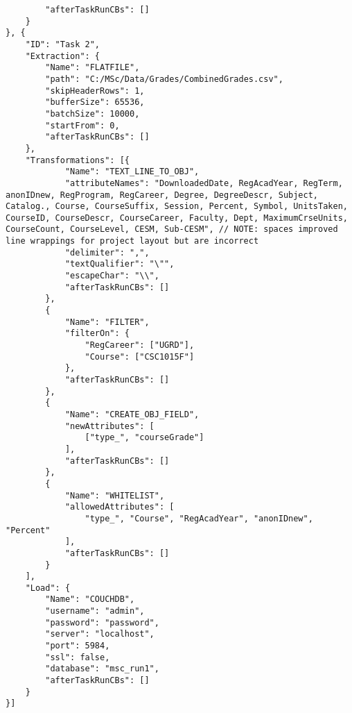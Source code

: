 \begin{verbatim}
        "afterTaskRunCBs": []
    }
}, {
    "ID": "Task 2",
    "Extraction": {
        "Name": "FLATFILE",
        "path": "C:/MSc/Data/Grades/CombinedGrades.csv",
        "skipHeaderRows": 1,
        "bufferSize": 65536,
        "batchSize": 10000,
        "startFrom": 0,
        "afterTaskRunCBs": []
    },
    "Transformations": [{
            "Name": "TEXT_LINE_TO_OBJ",
            "attributeNames": "DownloadedDate, RegAcadYear, RegTerm, anonIDnew, RegProgram, RegCareer, Degree, DegreeDescr, Subject, Catalog., Course, CourseSuffix, Session, Percent, Symbol, UnitsTaken, CourseID, CourseDescr, CourseCareer, Faculty, Dept, MaximumCrseUnits, CourseCount, CourseLevel, CESM, Sub-CESM", // NOTE: spaces improved line wrappings for project layout but are incorrect
            "delimiter": ",",
            "textQualifier": "\"",
            "escapeChar": "\\",
            "afterTaskRunCBs": []
        },
        {
            "Name": "FILTER",
            "filterOn": {
                "RegCareer": ["UGRD"],
                "Course": ["CSC1015F"]
            },
            "afterTaskRunCBs": []
        },
        {
            "Name": "CREATE_OBJ_FIELD",
            "newAttributes": [
                ["type_", "courseGrade"]
            ],
            "afterTaskRunCBs": []
        },
        {
            "Name": "WHITELIST",
            "allowedAttributes": [
                "type_", "Course", "RegAcadYear", "anonIDnew", "Percent"
            ],
            "afterTaskRunCBs": []
        }
    ],
    "Load": {
        "Name": "COUCHDB",
        "username": "admin",
        "password": "password",
        "server": "localhost",
        "port": 5984,
        "ssl": false,
        "database": "msc_run1",
        "afterTaskRunCBs": []
    }
}]
\end{verbatim}

